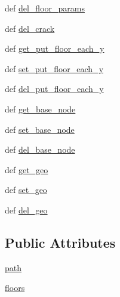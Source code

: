 \begin{DoxyCompactItemize}
\item 
def \hyperlink{classstructure_1_1_floor_structure_1_1_floor_structure_ae6ff22792c44770136ad17c8f8aa8901}{del\-\_\-floor\-\_\-params}
\item 
def \hyperlink{classstructure_1_1_floor_structure_1_1_floor_structure_a7fbd5d89fcdc6615bb8ce5803a8493c4}{del\-\_\-crack}
\item 
def \hyperlink{classstructure_1_1_floor_structure_1_1_floor_structure_a17da565d27dcaac00be2b79f3cf6c1b1}{get\-\_\-put\-\_\-floor\-\_\-each\-\_\-y}
\item 
def \hyperlink{classstructure_1_1_floor_structure_1_1_floor_structure_af87f03029cd8caa8fc9c46e1b8c52b76}{set\-\_\-put\-\_\-floor\-\_\-each\-\_\-y}
\item 
def \hyperlink{classstructure_1_1_floor_structure_1_1_floor_structure_a04a2ba51cd4be881859af8b4ff6014b4}{del\-\_\-put\-\_\-floor\-\_\-each\-\_\-y}
\item 
def \hyperlink{classstructure_1_1_floor_structure_1_1_floor_structure_a21f4dc99a716339c71340e6b1fc9c611}{get\-\_\-base\-\_\-node}
\item 
def \hyperlink{classstructure_1_1_floor_structure_1_1_floor_structure_a6b220f9cefd60c9c70f3ee0d1fb38b5a}{set\-\_\-base\-\_\-node}
\item 
def \hyperlink{classstructure_1_1_floor_structure_1_1_floor_structure_a79a4874633ebc0adee4d4e2c3a311386}{del\-\_\-base\-\_\-node}
\item 
def \hyperlink{classstructure_1_1_floor_structure_1_1_floor_structure_a784357926cfc8d3870b6961dcbc83a3d}{get\-\_\-geo}
\item 
def \hyperlink{classstructure_1_1_floor_structure_1_1_floor_structure_a275e7e35fcbe7755860a46aaf09feee9}{set\-\_\-geo}
\item 
def \hyperlink{classstructure_1_1_floor_structure_1_1_floor_structure_a18c1adf4349d90830a18c2306705b077}{del\-\_\-geo}
\end{DoxyCompactItemize}
\subsection*{Public Attributes}
\begin{DoxyCompactItemize}
\item 
\hyperlink{classstructure_1_1_floor_structure_1_1_floor_structure_a488c2961e8c893a32b3093902a3fa187}{path}
\item 
\hyperlink{classstructure_1_1_floor_structure_1_1_floor_structure_a8d9e129437374b715ad40d7d27cd878f}{floors}
\end{DoxyCompactItemize}
